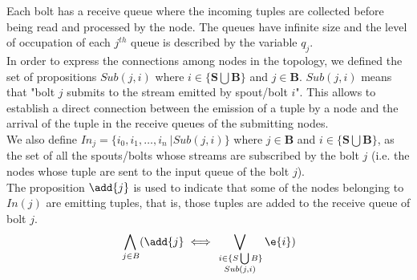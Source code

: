 Each bolt has a receive queue where the incoming tuples are collected before being read and processed by the node.
The queues have infinite size and the level of occupation of each $j^{th}$ queue is described by the variable $q_j$.\\
In order to express the connections among nodes in the topology, we defined the set of propositions $Sub(j,i)$ where $i \in \{ \mathbf{S} \bigcup \mathbf{B}\}$ and $j \in \mathbf{B}$. $Sub(j,i)$ means that "bolt $j$ submits to the stream emitted by spout/bolt $i$". This allows to establish a direct connection between the emission of a tuple by a node and the arrival of the tuple in the receive queues of the submitting nodes.\\
We also define $In_j=\{i_0,i_1, \dots, i_n\ | Sub(j,i) \}$ where $j\in \mathbf{B}$ and $i \in \{ \mathbf{S}\bigcup\mathbf{B}\}$, as the set of all the spouts/bolts whose streams are subscribed by the bolt $j$ (i.e. the nodes whose tuple are sent to the input queue of the bolt $j$).\\
The proposition $\add{j}$ is used to indicate that some of the nodes belonging to $In(j)$ are emitting tuples, that is, those tuples are added to the receive queue of bolt $j$.
\begin{align*}
 \bigwedge_{
\begin{subarray}{c}
\,j \in B
\end{subarray}
} ( \add{j} \iff 
\bigvee_{
\begin{subarray}{c}
\,i \in \{S \bigcup B \}\\
Sub(j,i)
\end{subarray}
 } \e{i})
\end{align*}
